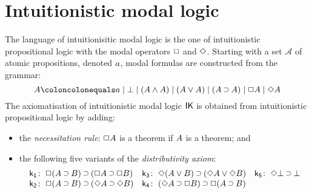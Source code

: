 \documentclass[twoside]{aiml20}
\begin{document}
%
%
%


\section{Intuitionistic modal logic}
The language of {intuitionisitic modal logic} is the one of intuitionistic propositional logic with the modal operators $\mathord{\Box}$ and $\mathord{\Diamond}$. %
%
Starting with a set $\mathcal{A}$ of atomic propositions, denoted $a$, modal formulas are constructed from the grammar:\vspace*{-.1cm}
%
$$
\fm A \coloncolonequals
\fm a \mid \fm{\BOT} \mid \fm{(A \AND A)} \mid \fm{(A \OR A)} \mid \fm{(A \IMP A)} \mid \fm{\BOX A} \mid \fm{\DIA A}
$$
%
The axiomatisation of intuitionistic modal logic $\mathsf{IK}$ \cite{plotkin1986,fischer1984}
%
is obtained from intuitionistic propositional logic by adding:
\begin{itemize}
	\item the \emph{necessitation rule}: $\mathord{\Box} A$ is a theorem if $A$ is a theorem; and
	\item the following five variants of the \emph{distributivity axiom}:\vspace*{-.1cm}
	\begin{equation*}
	\label{eq:ik}%
	\begin{array}[t]{r@{\;}l@{\quad}r@{\;}l@{\quad}r@{\;}l}
	\kax[1]\colon&\fm{\BOX(A\IMP B)\IMP(\BOX A\IMP\BOX B)}
	&
	\kax[3]\colon&\fm{\DIA(A\OR B)\IMP(\DIA A\OR\DIA B)}
	&
	\kax[5]\colon&\fm{\DIA\BOT\IMP\BOT}
	\\
	\kax[2]\colon&\fm{\BOX(A\IMP B)\IMP(\DIA A\IMP\DIA B)}
	&
	\kax[4]\colon&\fm{(\DIA A\IMP \BOX B)\IMP\BOX(A\IMP B)}\\%
	\end{array}
	\end{equation*}
\end{itemize}

\end{document}
